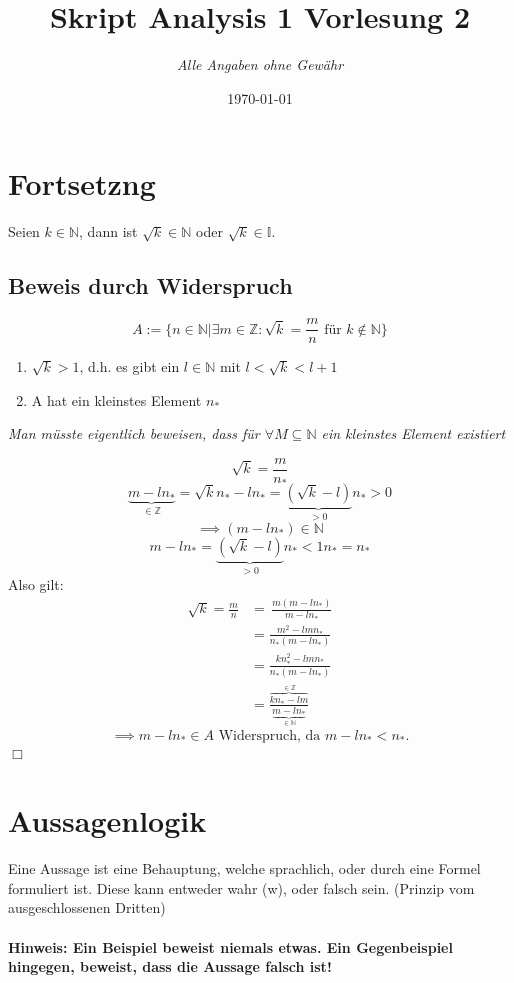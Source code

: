 \documentclass{article}
\title{Skript Analysis 1 Vorlesung 2} %
\author{\textit{Alle Angaben ohne Gewähr}} %
\date{\today} %
\begin{document}

	\maketitle %
    \section{Fortsetzng}
        Seien $k \in \mathbb{N}$, dann ist $\sqrt{k} \in \mathbb{N}$ oder $\sqrt{k} \in \mathbb{I}$.
        \subsection*{Beweis durch Widerspruch}
            $$A:=\{n\in\mathbb{N}|\exists m\in\mathbb{Z}: \sqrt{k}=\frac{m}{n} \text{ für } k \notin \mathbb{N}\}$$
            \begin{enumerate}
                \item $\sqrt{k}>1$, d.h. es gibt ein $l\in \mathbb{N}$ mit $l<\sqrt{k}<l+1$
                \item A hat ein kleinstes Element $n_*$
            \end{enumerate}
            \textit{Man müsste eigentlich beweisen, dass für $\forall M\subseteq \mathbb{N}$ ein kleinstes Element existiert}
            
             $$\sqrt{k}=\frac{m}{n_*}$$
             $$\underbrace{m-ln_*}_{\in \mathbb{Z}}=\sqrt{k}n_*-ln_*=\underbrace{(\sqrt{k}-l)}_{>0}n_*>0$$
             $$\implies (m-ln_*)\in \mathbb{N}$$
             $$m-ln_*=\underbrace{(\sqrt{k}-l)}_{>0}n_*<1n_*=n_*$$
             Also gilt:
            \begin{align*}
               \sqrt{k}=\frac{m}{n}&=\, \frac{m(m-ln_*)}{m-ln_*}\\
               \,&=\frac{m^2-lmn_*}{n_*(m-ln_*)}\\
               \, &=\frac{kn_*^2-lmn_*}{n_*(m-ln_*)}\\
               \, &=\frac{\overbrace{kn_*-lm}^{\in \mathbb{Z}}}{\underbrace{m-ln_*}_{\in \mathbb{N}}}
            \end{align*}
            $$\implies m-ln_*\in A \text{ Widerspruch, da } m-ln_*<n_*.$$
            \hfill $\Box$

    \section{Aussagenlogik}
        Eine Aussage ist eine Behauptung, welche sprachlich, oder durch eine Formel formuliert ist. Diese kann entweder wahr (w), oder falsch sein. (Prinzip vom ausgeschlossenen Dritten)\\\\
        \textbf{Hinweis: Ein Beispiel beweist niemals etwas. Ein Gegenbeispiel hingegen, beweist, dass die Aussage falsch ist!}\\\
\end{document}
